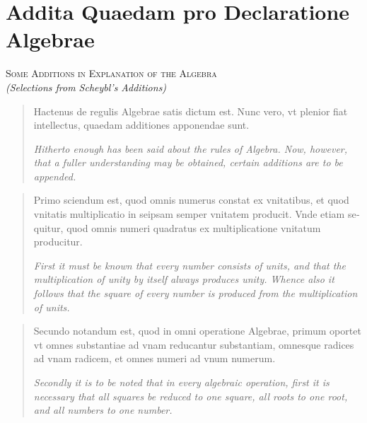 \documentclass[11pt,a4paper,twoside]{book}
\begin{document}
\chapter*{Addita Quaedam pro Declaratione Algebrae}

\begin{center}
\textsc{Some Additions in Explanation of the Algebra}\\
\textit{(Selections from Scheybl's Additions)}
\end{center}

\begin{quote}
\textlatin{Hactenus de regulis Algebrae satis dictum est. Nunc vero, vt plenior fiat intellectus, quaedam additiones apponendae sunt.}

\smallskip
\textit{Hitherto enough has been said about the rules of Algebra. Now, however, that a fuller understanding may be obtained, certain additions are to be appended.}
\end{quote}

\begin{quote}
\textlatin{Primo sciendum est, quod omnis numerus constat ex vnitatibus, et quod vnitatis multiplicatio in seipsam semper vnitatem producit. Vnde etiam sequitur, quod omnis numeri quadratus ex multiplicatione vnitatum producitur.}

\smallskip
\textit{First it must be known that every number consists of units, and that the multiplication of unity by itself always produces unity. Whence also it follows that the square of every number is produced from the multiplication of units.}
\end{quote}

\begin{quote}
\textlatin{Secundo notandum est, quod in omni operatione Algebrae, primum oportet vt omnes substantiae ad vnam reducantur substantiam, omnesque radices ad vnam radicem, et omnes numeri ad vnum numerum.}

\smallskip
\textit{Secondly it is to be noted that in every algebraic operation, first it is necessary that all squares be reduced to one square, all roots to one root, and all numbers to one number.}
\end{quote}
\end{document}
